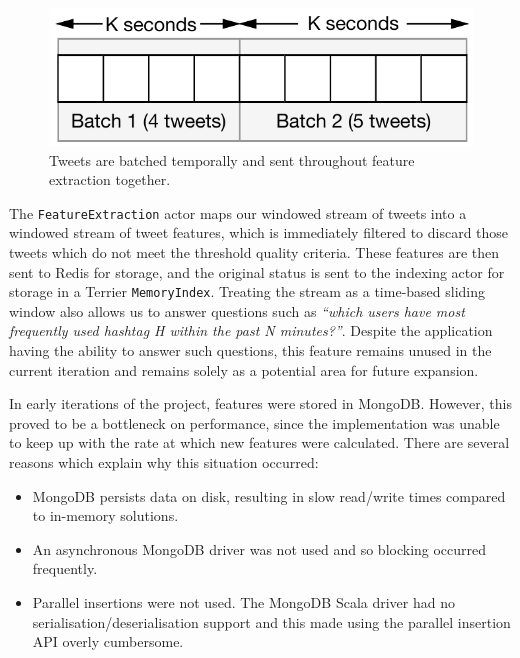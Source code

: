 \documentclass{l4proj}
\newcommand{\code}[1]{\texttt{#1}}
\begin{document}
\begin{figure}
\centering
\includegraphics[scale=0.8]{slidingwindow.pdf}
\caption{Tweets are batched temporally and sent throughout feature extraction together.}
\label{slidingwindow}
\end{figure}

        The \code{FeatureExtraction} actor maps our windowed stream of tweets into a windowed stream of tweet features, which is immediately filtered to discard those tweets which do not meet the threshold quality criteria. These features are then sent to Redis for storage, and the original status is sent to the indexing actor for storage in a Terrier \code{MemoryIndex}.
                Treating the stream as a time-based sliding window also allows us to answer questions such as \textit{``which users have most frequently used hashtag H within the past N minutes?''}. Despite the application having the ability to answer such questions, this feature remains unused in the current iteration and remains solely as a potential area for future expansion. 
        
        In early iterations of the project, features were stored in MongoDB. However, this proved to be a bottleneck on performance, since the implementation was unable to keep up with the rate at which new features were calculated. There are several reasons which explain why this situation occurred:
        
        \begin{itemize}
        \item MongoDB persists data on disk, resulting in slow read/write times compared to in-memory solutions.
        \item An asynchronous MongoDB driver was not used and so blocking occurred frequently.
        \item Parallel insertions were not used. The MongoDB Scala driver had no serialisation/deserialisation support and this made using the parallel insertion API overly cumbersome.
        \end{itemize}
        
\end{document}
